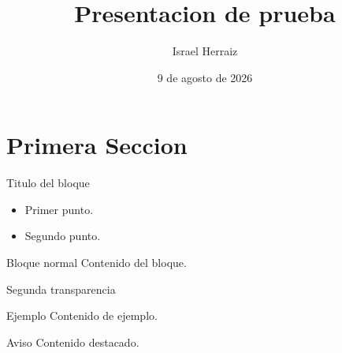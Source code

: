 \documentclass[aspectratio=169]{beamer}
\title{Presentacion de prueba}
\author{Israel Herraiz}
\date{9 de agosto de 2026}
\begin{document}
\section{Primera Seccion}

\begin{frame}{Titulo del bloque}
  \begin{itemize}
    \item Primer punto.
    \item Segundo punto.
  \end{itemize}
  \begin{block}{Bloque normal}
    Contenido del bloque.
  \end{block}
\end{frame}

\begin{frame}{Segunda transparencia}
  \begin{exampleblock}{Ejemplo}
    Contenido de ejemplo.
  \end{exampleblock}
  \begin{alertblock}{Aviso}
    Contenido destacado.
  \end{alertblock}
\end{frame}
\end{document}
